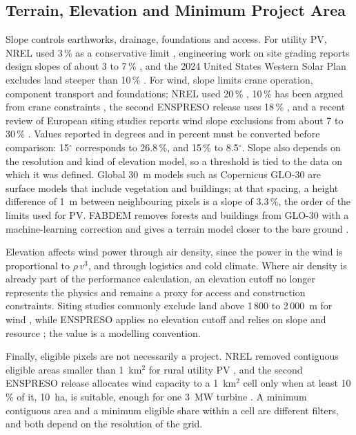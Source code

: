\subsection{Terrain, Elevation and Minimum Project Area}
\label{subsec:terrain_review}

Slope controls earthworks, drainage, foundations and access. For
utility PV, NREL used 3\,\% as a conservative limit \cite{lopez2012},
engineering work on site grading reports design slopes of about 3 to
7\,\% \cite{tao2024}, and the 2024 United States Western Solar Plan
excludes land steeper than 10\,\% \cite{blm2024westernsolar}. For wind,
slope limits crane operation, component transport and foundations; NREL
used 20\,\% \cite{lopez2012}, 10\,\% has been argued from crane
constraints \cite{vanhaaren2011}, the second ENSPRESO release uses
18\,\% \cite{elsner2023onshore}, and a recent review of European siting
studies reports wind slope exclusions from about 7 to 30\,\%
\cite{epg2024renewland}. Values reported in degrees and in
percent must be converted before comparison: 15$^\circ$ corresponds to
26.8\,\%, and 15\,\% to 8.5$^\circ$. Slope also depends on the
resolution and kind of elevation model, so a threshold is tied to the
data on which it was defined. Global 30~m models such as Copernicus
GLO-30 are surface models that include vegetation and buildings; at that
spacing, a height difference of 1~m between neighbouring pixels is a
slope of 3.3\,\%, the order of the limits used for PV. FABDEM removes forests and
buildings from GLO-30 with a machine-learning correction and gives a
terrain model closer to the bare ground \cite{hawker2022fabdem}.

Elevation affects wind power through air density, since the power in the
wind is proportional to $\rho\,v^3$, and through logistics and cold
climate. Where air density is already part of the performance
calculation, an elevation cutoff no longer represents the physics and
remains a proxy for access and construction constraints. Siting studies
commonly exclude land above 1\,800 to 2\,000~m for wind
\cite{epg2024renewland}, while ENSPRESO applies no elevation cutoff and
relies on slope and resource \cite{elsner2023onshore}; the value is a
modelling convention.

Finally, eligible pixels are not necessarily a project. NREL removed
contiguous eligible areas smaller than 1~km$^2$ for rural utility PV
\cite{lopez2012}, and the second ENSPRESO release allocates wind capacity
to a 1~km$^2$ cell only when at least 10\,\% of it, 10~ha, is suitable,
enough for one 3~MW turbine \cite{elsner2023onshore}. A minimum contiguous area and a minimum eligible share within a cell are
different filters, and both depend on the resolution of the grid.